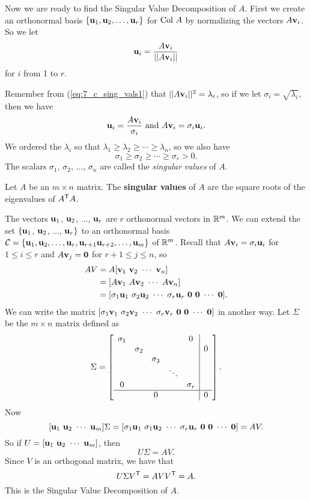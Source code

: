 Now we are ready to find the Singular Value Decomposition of $A$. First we create an orthonormal basis $\{\mathbf{u}_1, \mathbf{u}_2, \ldots, \mathbf{u}_r\}$ for $\text{Col } A$ by normalizing the vectors $A\mathbf{v}_i$. So we let
\[\mathbf{u}_i = \frac{A\mathbf{v}_i}{||A\mathbf{v}_i||}\]
for $i$ from 1 to $r$.

Remember from (\ref{eq:7_c_sing_vals1}) that $||A\mathbf{v}_i||^2 = \lambda_i$, so if we let $\sigma_i = \sqrt{\lambda_i}$, then we have
\[\mathbf{u}_i = \frac{A\mathbf{v}_i}{\sigma_i} \text{ and } A \mathbf{v}_i = \sigma_i \mathbf{u}_i.\]
We ordered the $\lambda_i$ so that $\lambda_1 \geq \lambda_2 \geq \cdots \geq \lambda_n$, so we also have
\[\sigma_1 \geq \sigma_2 \geq \cdots \geq \sigma_r > 0.\]
The scalars $\sigma_1$, $\sigma_2$, $\ldots$, $\sigma_n$ are called the \emph{singular values} of $A$.

\begin{definition} Let $A$ be an $m \times n$ matrix. The \textbf{singular values} of $A$ are the square roots of the eigenvalues of $A^{\mathsf{T}}A$. 
\end{definition} 

The vectors $\mathbf{u}_1$, $\mathbf{u}_2$, $\ldots$, $\mathbf{u}_r$ are $r$ orthonormal vectors in $\mathbb{R}^m$. We can extend the set $\{\mathbf{u}_1$, $\mathbf{u}_2$, $\ldots$, $\mathbf{u}_r\}$ to an orthonormal basis $\mathcal{C} = \{\mathbf{u}_1, \mathbf{u}_2, \ldots, \mathbf{u}_r, \mathbf{u}_{r+1} \mathbf{u}_{r+2}, \ldots, \mathbf{u}_m\}$ of $\mathbb{R}^m$. Recall that $A \mathbf{v}_i = \sigma_i \mathbf{u}_i$ for $1 \leq i \leq r$ and $A \mathbf{v}_j = \mathbf{0}$ for $r+1 \leq j \leq n$, so
\begin{align*}
AV &= A [\mathbf{v}_1 \  \mathbf{v}_2  \ \cdots  \ \mathbf{v}_n] \\
	&= [A\mathbf{v}_1  \ A\mathbf{v}_2  \ \cdots  \ A\mathbf{v}_n] \\
	&= [\sigma_1 \mathbf{u}_1  \ \sigma_2 \mathbf{u}_2  \ \cdots  \ \sigma_r \mathbf{u}_r  \ \mathbf{0}  \ \mathbf{0}  \ \cdots  \ \mathbf{0}].
\end{align*}
We can write the matrix $[\sigma_1 \vv_1  \ \sigma_2 \vv_2  \ \cdots  \ \sigma_r \vv_r  \ \vzero  \ \vzero  \ \cdots  \ \vzero]$ in another way. Let $\Sigma$ be the $m\times n$ matrix defined as
\[\Sigma = \left[ \begin{array}{ccccc|c} \sigma_1&&&&0& \\ & \sigma_2&&&&0 \\ && \sigma_3&&& \\ &  & & \ddots & & \\ 0&&&& \sigma_r \\ \hline &&0&&&0 \end{array} \right].\]
Now
\[[\vu_1  \ \vu_2  \ \cdots  \ \vu_m] \Sigma = [\sigma_1\vu_1  \ \sigma_1\vu_2  \ \cdots  \ \sigma_r\vu_r \ \vzero \ \vzero \ \cdots \ \vzero] = AV.\]
So if $U = [\mathbf{u}_1 \ \mathbf{u}_2 \ \cdots \ \mathbf{u}_m]$, then
\[U\Sigma = AV.\]
Since $V$ is an orthogonal matrix, we have that
\[U \Sigma V^{\mathsf{T}} = AV V^{\mathsf{T}} = A.\]
This is the Singular Value Decomposition of $A$.



